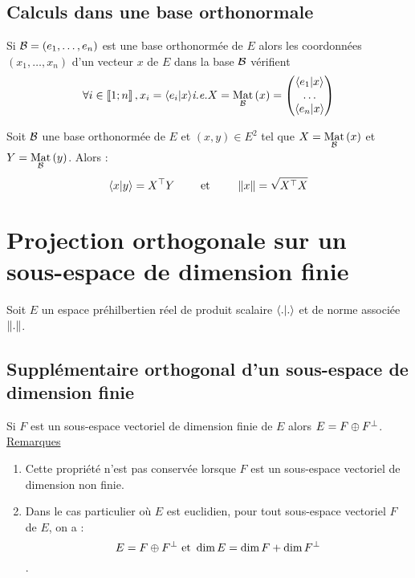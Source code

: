\subsection{Calculs dans une base orthonormale}
\begin{defprop}
    Si \(\cal{B} = (e_1, \dots , e_n)\) est une base orthonormée de \(E\) alors les coordonnées \((x_1, \dots , x_n)\) d’un vecteur \(x\) de \(E\) dans la base \(\cal{B}\) vérifient
        \[\forall i \in \interventierii{1}{n}, x_i = \scal{e_i}{x}\ie X = \Mat{\cal{B}}{x} =
        \begin{pmatrix}
        \scal{e_1}{x}   \\
        \dots   \\
        \scal{e_n}{x}   
        \end{pmatrix}
        \]
\end{defprop}
\begin{defprop}
    Soit \(\cal{B}\) une base orthonormée de \(E\) et \((x, y) \in E^2\) tel que \(X = \Mat{\cal{B}}{x}\) et \(Y = \Mat{\cal{B}}{y}\).
    Alors :
    \[\scal{x}{y} = \trans{X}Y \qquad\text{ et }\qquad \norme{x} = \sqrt{\trans{X}X}\]
\end{defprop}

\section{Projection orthogonale sur un sous-espace de dimension finie}
    Soit \(E\) un espace préhilbertien réel de produit scalaire \(\scal{.}{.}\) et de norme associée \(\norme{.}\).
\subsection{Supplémentaire orthogonal d’un sous-espace de dimension finie}
\begin{defprop}
    Si \(F\) est un sous-espace vectoriel de dimension finie de \(E\) alors \(E = F \oplus F\ortho\).\\
    \underline{Remarques}\\
    \begin{enumerate}
        \item Cette propriété n’est pas conservée lorsque \(F\) est un sous-espace vectoriel de dimension non finie.
        \item Dans le cas particulier où \(E\) est euclidien, pour tout sous-espace vectoriel \(F\) de \(E\), on a :
            \[E = F \oplus F\ortho \text{ et }\dim E = \dim F + \dim F\ortho\].
    \end{enumerate}
\end{defprop}
